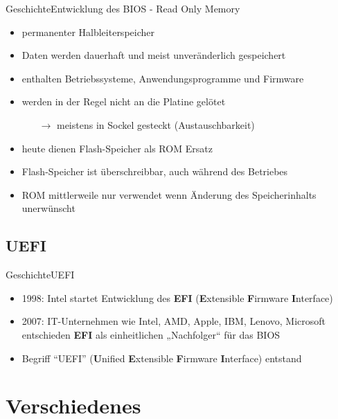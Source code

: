 \documentclass[9pt]{beamer}
\begin{document}
            \begin{frame}{Geschichte}{Entwicklung des BIOS - Read Only Memory}
                \begin{itemize}
                    \item permanenter Halbleiterspeicher
                    \item Daten werden dauerhaft und meist unveränderlich gespeichert
                    \item enthalten Betriebssysteme, Anwendungsprogramme und Firmware
                    \item werden in der Regel nicht an die Platine gelötet
                    \begin{itemize}
                        \item[$\rightarrow$] meistens in Sockel gesteckt (Austauschbarkeit)
                    \end{itemize}
                    \item heute dienen Flash-Speicher als ROM Ersatz
                    \item Flash-Speicher ist überschreibbar, auch während des Betriebes
                    \item ROM mittlerweile nur verwendet wenn Änderung des Speicherinhalts unerwünscht
                \end{itemize}
            \end{frame}

        \subsection{UEFI}
            \begin{frame}{Geschichte}{UEFI}
                \begin{itemize}
                    \item 1998: Intel startet Entwicklung des \textbf{EFI} (\textbf{E}xtensible \textbf{F}irmware \textbf{I}nterface)
                    \item 2007: IT-Unternehmen wie Intel, AMD,  Apple, IBM, Lenovo, Microsoft entschieden \textbf{EFI} als einheitlichen „Nachfolger“ für das BIOS
                    \item Begriff \enquote{UEFI} (\textbf{U}nified \textbf{E}xtensible \textbf{F}irmware \textbf{I}nterface) entstand
                \end{itemize}
            \end{frame}

    \section{Verschiedenes}
    
\end{document}
